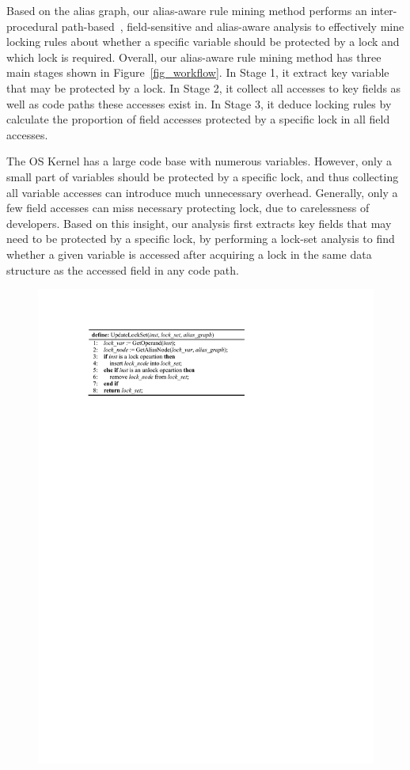 Based on the alias graph, our alias-aware rule mining method performs an 
inter-procedural path-based~\cite{Li:ASPLOS22}, field-sensitive and alias-aware 
analysis to effectively mine locking rules about whether a specific variable 
should be protected by a lock and which lock is required. Overall, our 
alias-aware rule mining method has three main stages shown in 
Figure~\ref{fig_workflow}. In Stage 1, it extract key variable that may be 
protected by a lock. In Stage 2, it collect all accesses to key fields as well 
as code paths these accesses exist in. In Stage 3, it deduce locking rules by 
calculate the proportion of field accesses protected by a specific lock in all 
field accesses. 

 The OS Kernel has a large code base with 
numerous variables. However, only a small part of variables should be protected 
by a specific lock, and thus collecting all variable accesses can introduce 
much unnecessary overhead. Generally, only a few field accesses can miss 
necessary protecting lock, due to carelessness of developers. Based on this 
insight, our analysis first extracts key fields that may need to be protected 
by a specific lock, by performing a lock-set analysis to find whether a given 
variable is accessed after acquiring a lock in the same data structure as the 
accessed field in any code path.

\begin{figure}[htbp]
	\centering
	\includegraphics[width=0.9\linewidth]{figures/fig_pseudocode_lock_set.pdf}
	\label{fig_pseudocode_lock_set}
\end{figure}

